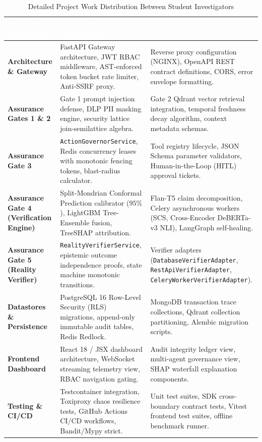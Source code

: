 \documentclass[11pt,a4paper]{article}
\newcommand{\hc}[1]{\textcolor{white}{\textbf{#1}}}
\newcommand{\hdrrow}{\rowcolor{primarynavy}}
\begin{document}
\begin{table}[!htbp]
\centering
\small
\caption{Detailed Project Work Distribution Between Student Investigators}
\label{tab:work_distribution}
\begin{tabularx}{\linewidth}{@{}L{3.8cm}L{6.2cm}L{6.2cm}@{}}
\toprule
\hdrrow \hc{Subsystem / Dimension} & \hc{Vedant Panchal (23AIML042)} & \hc{Dax Virani (23AIML076)} \\
\midrule
\textbf{Architecture \& Gateway} &
  FastAPI Gateway architecture, JWT RBAC middleware, AST-enforced token bucket rate limiter, Anti-SSRF proxy. &
  Reverse proxy configuration (NGINX), OpenAPI REST contract definitions, CORS, error envelope formatting. \\[4pt]
\textbf{Assurance Gates 1 \& 2} &
  Gate 1 prompt injection defense, DLP PII masking engine, security lattice join-semilattice algebra. &
  Gate 2 Qdrant vector retrieval integration, temporal freshness decay algorithm, context metadata schemas. \\[4pt]
\textbf{Assurance Gate 3} &
  \texttt{ActionGovernorService}, Redis concurrency leases with monotonic fencing tokens, blast-radius calculator. &
  Tool registry lifecycle, JSON Schema parameter validators, Human-in-the-Loop (HITL) approval tickets. \\[4pt]
\textbf{Assurance Gate 4 (Verification Engine)} &
  Split-Mondrian Conformal Prediction calibrator ($95\%$), LightGBM Tree-Ensemble fusion, TreeSHAP attribution. &
  Flan-T5 claim decomposition, Celery asynchronous workers (SCS, Cross-Encoder DeBERTa-v3 NLI), LangGraph self-healing. \\[4pt]
\textbf{Assurance Gate 5 (Reality Verifier)} &
  \texttt{RealityVerifierService}, epistemic outcome independence proofs, state machine monotonic transitions. &
  Verifier adapters (\texttt{DatabaseVerifierAdapter}, \texttt{RestApiVerifierAdapter}, \texttt{CeleryWorkerVerifierAdapter}). \\[4pt]
\textbf{Datastores \& Persistence} &
  PostgreSQL 16 Row-Level Security (RLS) migrations, append-only immutable audit tables, Redis Redlock. &
  MongoDB transaction trace collections, Qdrant collection partitioning, Alembic migration scripts. \\[4pt]
\textbf{Frontend Dashboard} &
  React 18 / JSX dashboard architecture, WebSocket streaming telemetry view, RBAC navigation gating. &
  Audit integrity ledger view, multi-agent governance view, SHAP waterfall explanation components. \\[4pt]
\textbf{Testing \& CI/CD} &
  Testcontainer integration, Toxiproxy chaos resilience tests, GitHub Actions CI/CD workflows, Bandit/Mypy strict. &
  Unit test suites, SDK cross-boundary contract tests, Vitest frontend test suites, offline benchmark runner. \\
\bottomrule
\end{tabularx}
\end{table}
\end{document}
